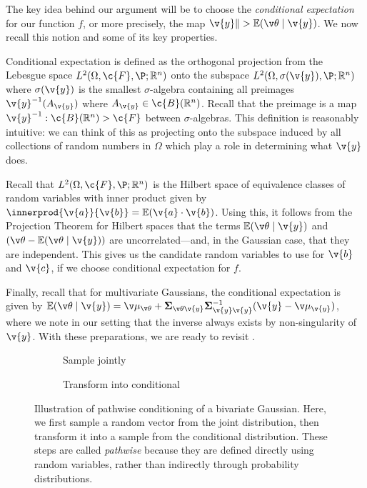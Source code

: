 \documentclass[11pt]{book}
\begin{document}
The key idea behind our argument will be to choose the \emph{conditional expectation} for our function $f$, or more precisely, the map $\v{y} \|> \E(\v\theta\given\v{y})$.
We now recall this notion and some of its key properties.

Conditional expectation is defined as the orthogonal projection from the Lebesgue space $L^2(\Omega,\c{F},\P;\R^n)$ onto the subspace $L^2(\Omega,\sigma(\v{y}),\P;\R^n)$ where $\sigma(\v{y})$ is the smallest $\sigma$-algebra containing all preimages $\v{y}^{-1}(A_{\v{y}})$ where $A_{\v{y}}\in\c{B}(\R^n)$. 
Recall that the preimage is a map $\v{y}^{-1} : \c{B}(\R^n) \-> \c{F}$ between $\sigma$-algebras.
This definition is reasonably intuitive: we can think of this as projecting onto the subspace induced by all collections of random numbers in $\Omega$ which play a role in determining what $\v{y}$ does.

Recall that $L^2(\Omega,\c{F},\P;\R^n)$ is the Hilbert space of equivalence classes of random variables with inner product given by $\innerprod{\v{a}}{\v{b}} = \E(\v{a}\cdot\v{b})$.
Using this, it follows from the Projection Theorem for Hilbert spaces that the terms $\E(\v\theta\given\v{y})$ and $(\v\theta - \E(\v\theta\given\v{y}))$ are uncorrelated---and, in the Gaussian case, that they are independent.
This gives us the candidate random variables to use for $\v{b}$ and $\v{c}$, if we choose conditional expectation for $f$.

Finally, recall that for multivariate Gaussians, the conditional expectation is given by $\E(\v\theta\given\v{y}) = \v\mu_{\v\theta} + \m\Sigma_{\v\theta\v{y}}\m\Sigma_{\v{y}\v{y}}^{-1}(\v{y} - \v\mu_{\v{y}})$, where we note in our setting that the inverse always exists by non-singularity of $\v{y}$.
With these preparations, we are ready to revisit .

\begin{figure}
\begin{subfigure}{0.49\textwidth}

\caption{Sample jointly}
\end{subfigure}
\begin{subfigure}{0.49\textwidth}

\caption{Transform into conditional}
\end{subfigure}
\caption{Illustration of pathwise conditioning of a bivariate Gaussian. Here, we first sample a random vector from the joint distribution, then transform it into a sample from the conditional distribution.
These steps are called \emph{pathwise} because they are defined directly using random variables, rather than indirectly through probability distributions.}
\label{fig:mvn-pw}
\end{figure}
\end{document}
